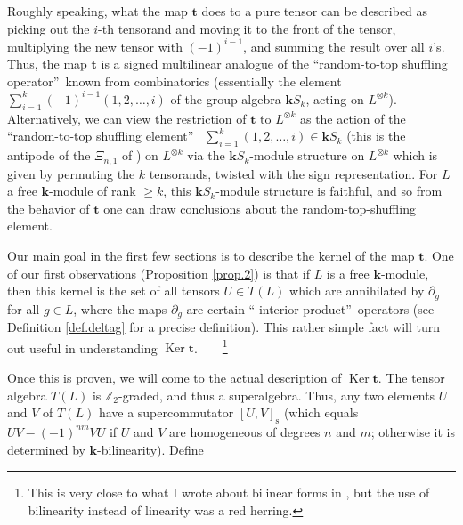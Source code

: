 \documentclass[numbers=enddot,12pt,final,onecolumn,notitlepage]{scrartcl}%
\theoremstyle{definition}
\let\sumnonlimits\sum
\renewcommand{\sum}{\sumnonlimits\limits}
\begin{document}
Roughly speaking, what the map $\mathbf{t}$ does to a pure tensor can be
described as picking out the $i$-th tensorand and moving it to the front of
the tensor, multiplying the new tensor with $\left(  -1\right)  ^{i-1}$, and
summing the result over all $i$'s. Thus, the map $\mathbf{t}$ is a signed
multilinear analogue of the \textquotedblleft random-to-top shuffling
operator\textquotedblright\ known from combinatorics (essentially the element
$\sum_{i=1}^{k}\left(  -1\right)  ^{i-1}\left(  1,2,\ldots,i\right)  $ of the
group algebra $\mathbf{k}S_{k}$, acting on $L^{\otimes k}$). Alternatively, we
can view the restriction of $\mathbf{t}$ to $L^{\otimes k}$ as the action of
the \textquotedblleft random-to-top shuffling element\textquotedblright%
\ $\sum_{i=1}^{k}\left(  1,2,\ldots,i\right)  \in\mathbf{k}S_{k}$ (this is the
antipode of the $\Xi_{n,1}$ of \cite{schocker}) on $L^{\otimes k}$ via the
$\mathbf{k}S_{k}$-module structure on $L^{\otimes k}$ which is given by
permuting the $k$ tensorands, twisted with the sign representation. For $L$ a
free $\mathbf{k}$-module of rank $\geq k$, this $\mathbf{k}S_{k}$-module
structure is faithful, and so from the behavior of $\mathbf{t}$ one can draw
conclusions about the random-top-shuffling element.

Our main goal in the first few sections is to describe the kernel of the map
$\mathbf{t}$. One of our first observations (Proposition \ref{prop.2}) is that
if $L$ is a free $\mathbf{k}$-module, then this kernel is the set of all
tensors $U\in T\left(  L\right)  $ which are annihilated by $\partial_{g}$ for
all $g\in L$, where the maps $\partial_{g}$ are certain \textquotedblleft
interior product\textquotedblright\ operators (see Definition \ref{def.deltag}
for a precise definition). This rather simple fact will turn out useful in
understanding $\operatorname*{Ker}\mathbf{t}$.\ \ \ \ \footnote{This is very
close to what I wrote about bilinear forms in \cite{mo}, but the use of
bilinearity instead of linearity was a red herring.}

Once this is proven, we will come to the actual description of
$\operatorname*{Ker}\mathbf{t}$. The tensor algebra $T\left(  L\right)  $ is
$\mathbb{Z}_{2}$-graded, and thus a superalgebra. Thus, any two elements $U$
and $V$ of $T\left(  L\right)  $ have a supercommutator $\left[  U,V\right]
_{\operatorname*{s}}$ (which equals $UV-\left(  -1\right)  ^{nm}VU$ if $U$ and
$V$ are homogeneous of degrees $n$ and $m$; otherwise it is determined by
$\mathbf{k}$-bilinearity). Define
\end{document}
